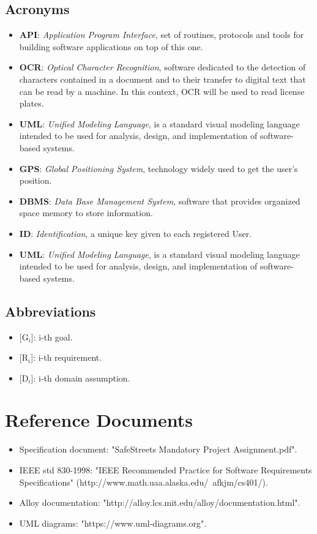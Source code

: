 \documentclass{report}
\begin{document}
\subsection{Acronyms}
\begin{itemize}
\item \textbf{API}: \textit{Application Program Interface}, set of routines, protocols and tools for building software applications on top of this one.
\item \textbf{OCR}: \textit{Optical Character Recognition}, software dedicated to the detection of characters contained in a document and to their transfer to digital text that can be read by a machine. In this context, OCR will be used to read license plates.
\item \textbf{UML}: \textit{Unified Modeling Language}, is a standard visual modeling language intended to be used for analysis, design, and implementation of software-based systems.
\item \textbf{GPS}: \textit{Global Positioning System}, technology widely used to get the user's position.
\item \textbf{DBMS}: \textit{Data Base Management System}, software that provides organized space memory to store information.
\item \textbf{ID}: \textit{Identification}, a unique key given to each registered User.
\item \textbf{UML}: \textit{Unified Modeling Language}, is a standard visual modeling language intended to be used for analysis, design, and implementation of software-based systems.
\end{itemize}
\subsection{Abbreviations}
\begin{itemize}
\item {[G$_{i}$]}: i-th goal.
\item {[R$_{i}$]}: i-th requirement.
\item {[D$_{i}$]}: i-th domain assumption.
\end{itemize}
\section{Reference Documents}
\begin{itemize}
	\item Specification document: "SafeStreets Mandatory Project Assignment.pdf".
	\item IEEE std 830-1998: "IEEE Recommended Practice for Software Requirements Specifications" (http://www.math.uaa.alaska.edu/~afkjm/cs401/).
	\item Alloy documentation: "http://alloy.lcs.mit.edu/alloy/documentation.html".
	\item UML diagrams: "https://www.uml-diagrams.org".
\end{itemize}
\end{document}
